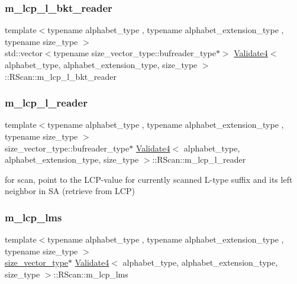 \subsubsection{\texorpdfstring{m\+\_\+lcp\+\_\+l\+\_\+bkt\+\_\+reader}{m\_lcp\_l\_bkt\_reader}}
{\footnotesize\ttfamily template$<$typename alphabet\+\_\+type , typename alphabet\+\_\+extension\+\_\+type , typename size\+\_\+type $>$ \\
std\+::vector$<$typename size\+\_\+vector\+\_\+type\+::bufreader\+\_\+type$\ast$$>$ \hyperlink{class_validate4}{Validate4}$<$ alphabet\+\_\+type, alphabet\+\_\+extension\+\_\+type, size\+\_\+type $>$\+::R\+Scan\+::m\+\_\+lcp\+\_\+l\+\_\+bkt\+\_\+reader\hspace{0.3cm}{\ttfamily [private]}}

\mbox{\label{struct_validate4_1_1_r_scan_a9aa4704ec4b22e0ecbec8c1c9687521d}} 
\subsubsection{\texorpdfstring{m\+\_\+lcp\+\_\+l\+\_\+reader}{m\_lcp\_l\_reader}}
{\footnotesize\ttfamily template$<$typename alphabet\+\_\+type , typename alphabet\+\_\+extension\+\_\+type , typename size\+\_\+type $>$ \\
size\+\_\+vector\+\_\+type\+::bufreader\+\_\+type$\ast$ \hyperlink{class_validate4}{Validate4}$<$ alphabet\+\_\+type, alphabet\+\_\+extension\+\_\+type, size\+\_\+type $>$\+::R\+Scan\+::m\+\_\+lcp\+\_\+l\+\_\+reader\hspace{0.3cm}{\ttfamily [private]}}



for scan, point to the L\+C\+P-\/value for currently scanned L-\/type suffix and its left neighbor in SA (retrieve from L\+CP) 

\mbox{\label{struct_validate4_1_1_r_scan_adf3e4856d77cd795d6b00b2355bd48bd}} 
\subsubsection{\texorpdfstring{m\+\_\+lcp\+\_\+lms}{m\_lcp\_lms}}
{\footnotesize\ttfamily template$<$typename alphabet\+\_\+type , typename alphabet\+\_\+extension\+\_\+type , typename size\+\_\+type $>$ \\
\hyperlink{class_validate4_a46ea31a0a4b23f583806792160421d15}{size\+\_\+vector\+\_\+type}$\ast$ \hyperlink{class_validate4}{Validate4}$<$ alphabet\+\_\+type, alphabet\+\_\+extension\+\_\+type, size\+\_\+type $>$\+::R\+Scan\+::m\+\_\+lcp\+\_\+lms\hspace{0.3cm}{\ttfamily [private]}}



